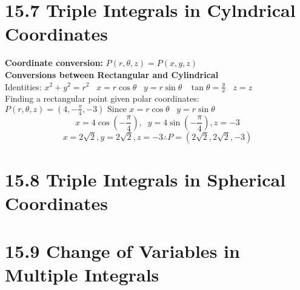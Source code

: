 \documentclass{article}
\begin{document}
\section*{15.7 Triple Integrals in Cylndrical Coordinates}
\textbf{Coordinate conversion:} $P(r,\theta, z) = P(x,y,z)$\\
\textbf{Conversions between Rectangular and Cylindrical}
 \\Identities: $x^2+y^2=r^2 \; \; \; x=r\cos\theta \; \; \; y=r\sin\theta \;\;\; \tan \theta = \frac{y}{x} \;\;\; z=z$
\\Finding a rectangular point given polar coordinates:\\[0.05in]
$P(r,\theta, z) = (4,-\frac{\pi}{4},-3)\text{ Since }x=r\cos\theta \; \; \; y=r\sin\theta \;\;\;$
$$x=4\cos\left(-\frac{\pi}{4}\right), \;\; y=4\sin\left(-\frac{\pi}{4}\right), z=-3$$
$$ x=2\sqrt{2}, y=2\sqrt{2}, z=-3 \therefore P=(2\sqrt{2},2\sqrt{2}, -3)$$

\section*{15.8 Triple Integrals in Spherical Coordinates}
\section*{15.9 Change of Variables in Multiple Integrals}
\end{document}
